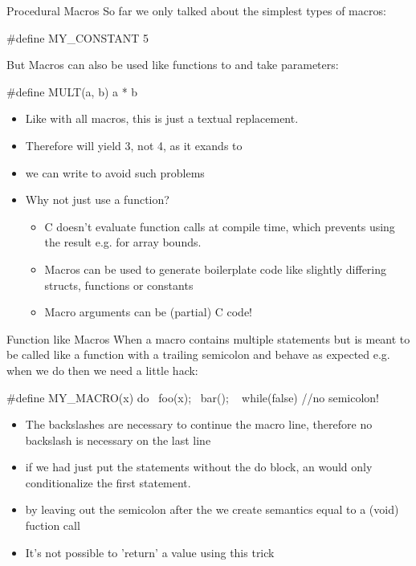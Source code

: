 \documentclass[10pt,graphics,aspectratio=169,table]{beamer}
\begin{document}
\begin{frame}[fragile]{Procedural Macros}
    So far we only talked about the simplest types of macros: 
    \begin{codeblock}
#define MY_CONSTANT 5
    \end{codeblock}

    But Macros can also be used like functions to and take parameters:
    \begin{codeblock}
#define MULT(a, b) a * b
    \end{codeblock}
    \begin{itemize}
        \item Like with all macros, this is just a textual replacement.
        \item Therefore  will yield 3,
         not 4, as it exands to 
        \item we can write 
         to avoid such problems
        \item Why not just use a function? 
        \begin{itemize}
            \item C doesn't evaluate function calls
            at compile time, which prevents using the result e.g. for array bounds. 
            \item Macros can be used to generate boilerplate code like
                slightly differing structs, functions or constants 
            \item Macro arguments can be (partial) C code!
        \end{itemize}
    \end{itemize}
\end{frame}

\begin{frame}[fragile]{Function like Macros}
    When a macro contains multiple statements but is meant to be called like
    a function with a trailing semicolon and behave as expected e.g.
    when we do  then we need a little hack: 
    \begin{codeblock}
#define MY_MACRO(x) do{             \
    foo(x);                         \
    bar();                          \
} while(false) //no semicolon! 
    \end{codeblock}

    \begin{itemize}
        \item The backslashes are necessary to continue the macro line,
            therefore no backslash is necessary on the last line
        \item if we had just put the statements without the do block, 
            an \code{if} would only conditionalize the first statement.
        \item by leaving out the semicolon after the  
            we create semantics equal to a (void) fuction call
        \item It's not possible to 'return' a value using this trick
    \end{itemize}
\end{frame}
\end{document}
